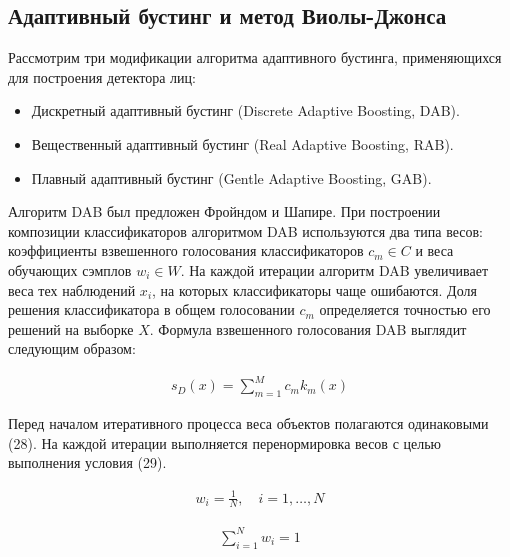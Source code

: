 \subsection{Адаптивный бустинг и метод Виолы-Джонса}

Рассмотрим три модификации алгоритма адаптивного бустинга, применяющихся для построения детектора лиц:
\begin{itemize}
\item Дискретный адаптивный бустинг (Discrete Adaptive Boosting, DAB).
\item Вещественный адаптивный бустинг (Real Adaptive Boosting, RAB).
\item Плавный адаптивный бустинг (Gentle Adaptive Boosting, GAB).
\end{itemize}

Алгоритм DAB был предложен Фройндом и Шапире. При построении композиции классификаторов алгоритмом DAB используются два типа весов: коэффициенты взвешенного голосования классификаторов $c_m \in C$ и веса обучающих сэмплов $w_i \in W$. На каждой итерации алгоритм DAB увеличивает веса тех наблюдений $x_i$, на которых классификаторы чаще ошибаются. Доля решения классификатора в общем голосовании $c_m$ определяется точностью его решений на выборке $X$. Формула взвешенного голосования DAB выглядит следующим образом:

\begin{gather}
s_D(x)=\sum\limits_{m=1}^{M}c_mk_m(x)
\end{gather}

Перед началом итеративного процесса веса объектов полагаются одинаковыми (28). На каждой итерации выполняется перенормировка весов с целью выполнения условия (29).

\begin{gather}
w_i=\frac{1}{N},\quad i = 1, \dots, N
\end{gather}

\begin{gather}
\sum\limits_{i=1}^{N}w_i=1
\end{gather}

